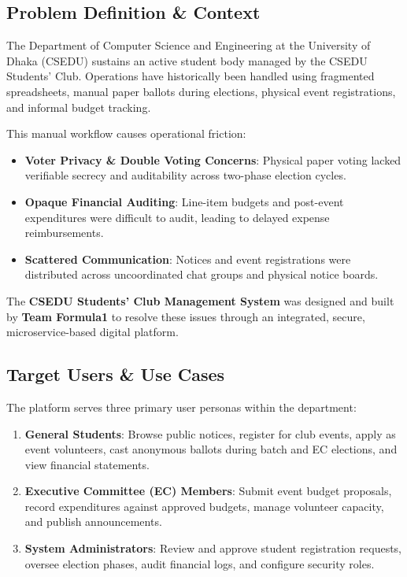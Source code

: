 \documentclass[12pt, a4paper]{article}
\begin{document}
\subsection{Problem Definition \& Context}
The Department of Computer Science and Engineering at the University of Dhaka (CSEDU) sustains an active student body managed by the CSEDU Students' Club. Operations have historically been handled using fragmented spreadsheets, manual paper ballots during elections, physical event registrations, and informal budget tracking. 

This manual workflow causes operational friction:
\begin{itemize}
    \item \textbf{Voter Privacy \& Double Voting Concerns}: Physical paper voting lacked verifiable secrecy and auditability across two-phase election cycles.
    \item \textbf{Opaque Financial Auditing}: Line-item budgets and post-event expenditures were difficult to audit, leading to delayed expense reimbursements.
    \item \textbf{Scattered Communication}: Notices and event registrations were distributed across uncoordinated chat groups and physical notice boards.
\end{itemize}

The \textbf{CSEDU Students' Club Management System} was designed and built by \textbf{Team Formula1} to resolve these issues through an integrated, secure, microservice-based digital platform.

\subsection{Target Users \& Use Cases}
The platform serves three primary user personas within the department:
\begin{enumerate}
    \item \textbf{General Students}: Browse public notices, register for club events, apply as event volunteers, cast anonymous ballots during batch and EC elections, and view financial statements.
    \item \textbf{Executive Committee (EC) Members}: Submit event budget proposals, record expenditures against approved budgets, manage volunteer capacity, and publish announcements.
    \item \textbf{System Administrators}: Review and approve student registration requests, oversee election phases, audit financial logs, and configure security roles.
\end{enumerate}
\end{document}
